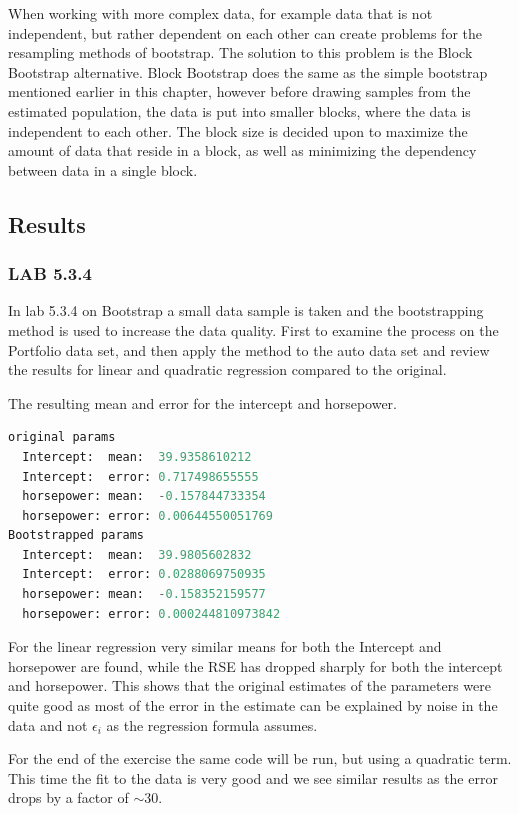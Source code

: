 When working with more complex data, for example data that is not independent, but rather dependent on each other can create problems for the resampling methods of bootstrap. The solution to this problem is the Block Bootstrap alternative. Block Bootstrap does the same as the simple bootstrap mentioned earlier in this chapter, however before drawing samples from the estimated population, the data is put into smaller blocks, where the data is independent to each other. The block size is decided upon to maximize the amount of data that reside in a block, as well as minimizing the dependency between data in a single block.

\subsection{Results}
\subsubsection*{LAB 5.3.4}

In lab 5.3.4 on Bootstrap a small data sample is taken and the bootstrapping method is used to increase the data quality. First to examine the process on the Portfolio data set, and then apply the method to the auto data set and review the results for linear and quadratic regression compared to the original.

The resulting mean and error for the intercept and horsepower.
\begin{lstlisting}[language=Python]
original params
  Intercept:  mean:  39.9358610212
  Intercept:  error: 0.717498655555
  horsepower: mean:  -0.157844733354
  horsepower: error: 0.00644550051769
Bootstrapped params
  Intercept:  mean:  39.9805602832
  Intercept:  error: 0.0288069750935
  horsepower: mean:  -0.158352159577
  horsepower: error: 0.000244810973842
\end{lstlisting}

For the linear regression very similar means for both the Intercept and horsepower are found, while the RSE has dropped sharply for both the intercept and horsepower. This shows that the original estimates of the parameters were quite good as most of the error in the estimate can be explained by noise in the data and not $\epsilon_i$ as the regression formula assumes.

For the end of the exercise the same code will be run, but using a quadratic term. This time the fit to the data is very good and we see similar results as the error drops by a factor of $\sim30$.

